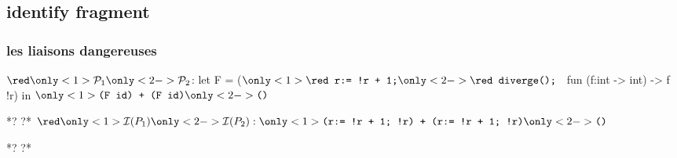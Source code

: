 %

\subsection*{identify fragment}
\begin{frame}[fragile]\frametitle{les liaisons dangereuses}
\begin{small}
\begin{whycode} 
${\red \only<1>{\mathcal{P}_1}\only<2->{\mathcal{P}_2}}$: 
   let F = 
      ($\only<1>{\texttt{\red r:= !r + 1;}}\only<2->{\texttt{\red diverge(); }}$ fun (f:int -> int) -> f !r)
   in $\only<1>{\texttt{(F id) + (F id)}}\only<2->{\texttt{()}}$
   
*?%
?* 
${\red\only<1>{ \mathcal{I}(P_1)}\only<2->{\mathcal{I}(P_2)}}: \only<1>{\texttt{(r:= !r + 1; !r) + (r:= !r + 1; !r)}}
\only<2->{\texttt{()}}$
   
*?%
?*
\end{whycode}
\end{small}
\end{frame}

